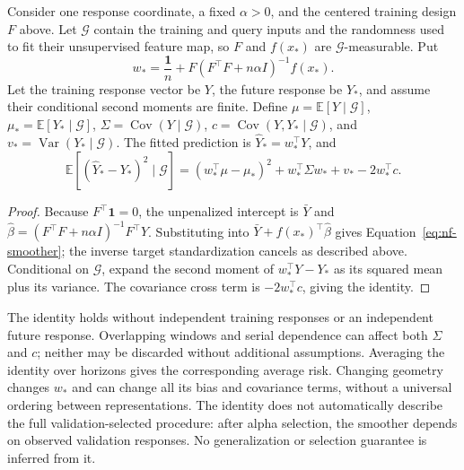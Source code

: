 \begin{proposition}
\label{prop:nf-linear-risk}
Consider one response coordinate, a fixed $\alpha>0$, and the centered
training design $F$ above.  Let $\mathcal G$ contain the training and query
inputs and the randomness used to fit their unsupervised feature map, so
$F$ and $f(x_*)$ are $\mathcal G$-measurable.  Put
\begin{equation}
 w_* = \frac{\mathbf 1}{n}
       +F(F^\top F+n\alpha I)^{-1}f(x_*).
 \label{eq:nf-smoother}
\end{equation}
Let the training response vector be $Y$, the future response be $Y_*$, and
assume their conditional second moments are finite.  Define
$\mu=\mathbb E[Y\mid\mathcal G]$,
$\mu_*=\mathbb E[Y_*\mid\mathcal G]$,
$\Sigma=\operatorname{Cov}(Y\mid\mathcal G)$,
$c=\operatorname{Cov}(Y,Y_*\mid\mathcal G)$, and
$v_*=\operatorname{Var}(Y_*\mid\mathcal G)$.  The fitted prediction is
$\widehat Y_*=w_*^\top Y$, and
\begin{equation}
 \mathbb E[(\widehat Y_*-Y_*)^2\mid\mathcal G]
   =(w_*^\top\mu-\mu_*)^2+w_*^\top\Sigma w_*+v_*-2w_*^\top c.
 \label{eq:nf-dependent-risk}
\end{equation}
\end{proposition}
\begin{proof}
Because $F^\top\mathbf 1=0$, the unpenalized intercept is $\bar Y$ and
$\widehat\beta=(F^\top F+n\alpha I)^{-1}F^\top Y$.
Substituting into $\bar Y+f(x_*)^\top\widehat\beta$ gives
Equation~\eqref{eq:nf-smoother}; the inverse target standardization cancels
as described above.  Conditional on $\mathcal G$, expand the second moment
of $w_*^\top Y-Y_*$ as its squared mean plus its variance.  The covariance
cross term is $-2w_*^\top c$, giving the identity.
\end{proof}

The identity holds without independent training responses or an independent
future response.  Overlapping windows and serial dependence can affect both
$\Sigma$ and $c$; neither may be discarded without additional assumptions.
Averaging the identity over horizons gives the corresponding average risk.
Changing geometry changes $w_*$ and can change all its bias and covariance
terms, without a universal ordering between representations.  The identity
does not automatically describe the full validation-selected procedure:
after alpha selection, the smoother depends on observed validation responses.
No generalization or selection guarantee is inferred from it.
